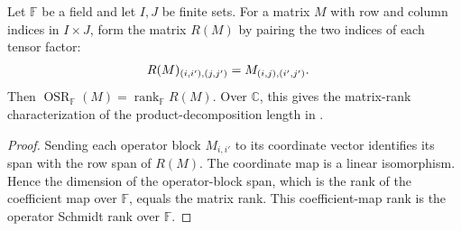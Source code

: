 \begin{theorem}
    \label{thm:operator_schmidt_realignment_rank}
    \leanok
    Let $\mathbb F$ be a field and let $I,J$ be finite sets. For a matrix
    $M$ with row and column indices in $I\times J$, form the matrix $R(M)$
    by pairing the two indices of each tensor factor:
    \begin{align}
        R(M)_{(i,i'),(j,j')}
         & =M_{(i,j),(i',j')}. \notag
    \end{align}
    Then $\operatorname{OSR}_{\mathbb F}(M)=\operatorname{rank}_{\mathbb F}R(M)$.
    Over $\mathbb C$, this gives the matrix-rank characterization of the
    product-decomposition length in
    \cite[(1)]{DeLasCuevas2019Separability}.
\end{theorem}
\begin{proof}\leanok
    Sending each operator block $M_{i,i'}$ to its coordinate vector
    identifies its span with the row span of $R(M)$. The coordinate map
    is a linear isomorphism. Hence the dimension of the operator-block
    span, which is the rank of the coefficient map over $\mathbb F$,
    equals the matrix rank. This coefficient-map rank is the operator
    Schmidt rank over $\mathbb F$.
\end{proof}

